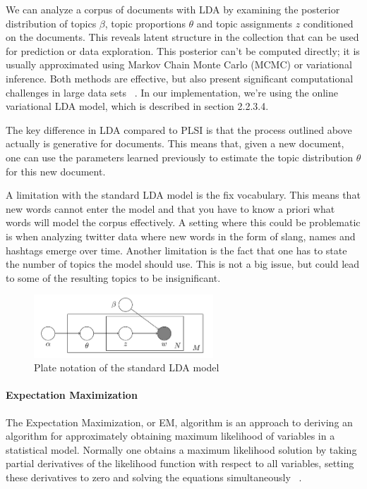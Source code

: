 \documentclass[12pt]{report}
\begin{document}
We can analyze a corpus of documents with LDA by examining the posterior
distribution of topics $\beta$, topic proportions $\theta$ and topic
assignments $z$ conditioned on the documents. This reveals latent structure in
the collection that can be used for prediction or data exploration. This
posterior can't be computed directly; it is usually approximated using Markov
Chain Monte Carlo (MCMC) or variational inference. Both methods are effective,
but also present significant computational challenges in large data sets
~\cite{onlineLDAvb}. In our implementation, we're using the online variational
LDA model, which is described in section 2.2.3.4.
 
The key difference in LDA compared to PLSI is that the process outlined above
actually is generative for documents. This means that, given a new document,
one can use the parameters learned previously to estimate the topic
distribution $\theta$ for this new document.
 
A limitation with the standard LDA model is the fix vocabulary. This means that
new words cannot enter the model and that you have to know a priori what words
will model the corpus effectively. A setting where this could be problematic is
when analyzing twitter data where new words in the form of slang, names and
hashtags emerge over time. Another limitation is the fact that one has to state
the number of topics the model should use. This is not a big issue, but could
lead to some of the resulting topics to be insignificant.

\begin{center}
\begin{figure}
\centering
\includegraphics[width=0.6\textwidth]{LDA_standard_model.png}
\caption{Plate notation of the standard LDA model}
\end{figure}
\end{center}


\paragraph{Expectation Maximization}

The Expectation Maximization, or EM, algorithm is an approach to deriving an
algorithm for approximately obtaining maximum likelihood of variables in a
statistical model. Normally one obtains a maximum likelihood solution by taking
partial derivatives of the likelihood function with respect to all variables,
setting these derivatives to zero and solving the equations simultaneously 
~\cite{Myung:2003}.
\end{document}
